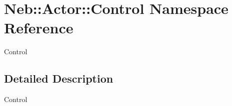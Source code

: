 \hypertarget{namespaceNeb_1_1Actor_1_1Control}{\section{\-Neb\-:\-:\-Actor\-:\-:\-Control \-Namespace \-Reference}
\label{namespaceNeb_1_1Actor_1_1Control}
}


\-Control  




\subsection{\-Detailed \-Description}
\-Control 